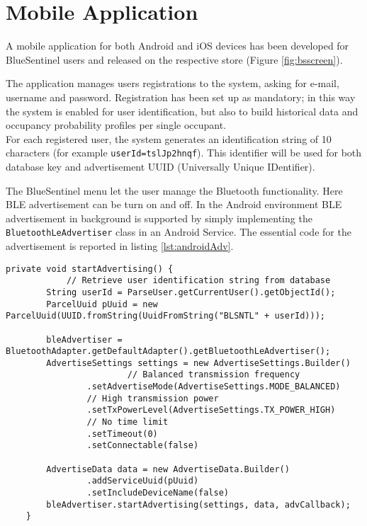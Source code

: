 \section{Mobile Application}
\label{sec:app}
A mobile application for both Android and iOS devices has been developed for BlueSentinel users and released on the respective store \cite{NECSTboxAndroid, NECSTboxIos} (Figure \ref{fig:bsscreen}).

The application manages users registrations to the system, asking for e-mail, username and password. Registration has been set up as mandatory; in this way the system is enabled for user identification, but also to build historical data and occupancy probability profiles per single occupant.\\
For each registered user, the system generates an identification string of 10 characters (for example \verb|userId=tslJp2hnqf|). This identifier will be used for both database key and advertisement UUID (Universally Unique IDentifier).

\lstset{
  basicstyle=\ttfamily\footnotesize,
  language=Java,
  columns=fullflexible,
  keepspaces=true,
}

The BlueSentinel menu let the user manage the Bluetooth functionality. Here BLE advertisement can be turn on and off.
In the Android environment BLE advertisement in background is supported by simply implementing the \verb|BluetoothLeAdvertiser| class in an Android Service. The essential code for the advertisement is reported in listing \ref{lst:androidAdv}.

\begin{minipage}{\linewidth}
\begin{lstlisting}[caption={BLE advertising of user identification for Android devices.}, label={lst:androidAdv}]
    private void startAdvertising() {
    		// Retrieve user identification string from database
        String userId = ParseUser.getCurrentUser().getObjectId();
        ParcelUuid pUuid = new ParcelUuid(UUID.fromString(UuidFromString("BLSNTL" + userId)));

        bleAdvertiser = BluetoothAdapter.getDefaultAdapter().getBluetoothLeAdvertiser();
        AdvertiseSettings settings = new AdvertiseSettings.Builder()
        				// Balanced transmission frequency
                .setAdvertiseMode(AdvertiseSettings.MODE_BALANCED)
                // High transmission power
                .setTxPowerLevel(AdvertiseSettings.TX_POWER_HIGH)
                // No time limit
                .setTimeout(0)
                .setConnectable(false)

        AdvertiseData data = new AdvertiseData.Builder()
        		.addServiceUuid(pUuid)
                .setIncludeDeviceName(false)
        bleAdvertiser.startAdvertising(settings, data, advCallback);
    }
\end{lstlisting}
\end{minipage}

